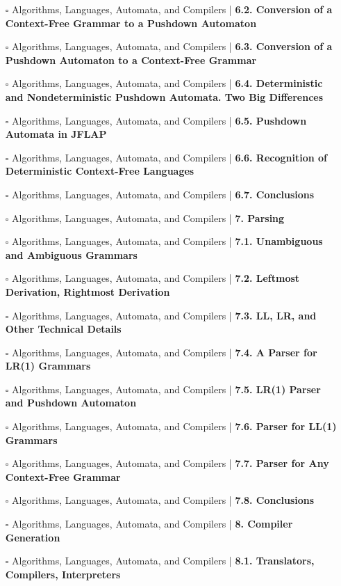 \documentclass[a4, landscape, 12pt]{article}
\newcommand{\checkbox}{$\square$}%
\begin{document}
\begin{itemize}
{}
\item [\checkbox]  Algorithms, Languages, Automata, and Compilers | \textbf{ 6.2. Conversion of a Context-Free Grammar to a Pushdown Automaton
}
\item [\checkbox]  Algorithms, Languages, Automata, and Compilers | \textbf{ 6.3. Conversion of a Pushdown Automaton to a Context-Free Grammar
}
\item [\checkbox]  Algorithms, Languages, Automata, and Compilers | \textbf{ 6.4. Deterministic and Nondeterministic Pushdown Automata. Two Big Differences
}
\item [\checkbox]  Algorithms, Languages, Automata, and Compilers | \textbf{ 6.5. Pushdown Automata in JFLAP
}
\item [\checkbox]  Algorithms, Languages, Automata, and Compilers | \textbf{ 6.6. Recognition of Deterministic Context-Free Languages
}
\item [\checkbox]  Algorithms, Languages, Automata, and Compilers | \textbf{ 6.7. Conclusions
}
\item [\checkbox]  Algorithms, Languages, Automata, and Compilers | \textbf{ 7. Parsing
}
\item [\checkbox]  Algorithms, Languages, Automata, and Compilers | \textbf{ 7.1. Unambiguous and Ambiguous Grammars
}
\item [\checkbox]  Algorithms, Languages, Automata, and Compilers | \textbf{ 7.2. Leftmost Derivation, Rightmost Derivation
}
\item [\checkbox]  Algorithms, Languages, Automata, and Compilers | \textbf{ 7.3. LL, LR, and Other Technical Details
}
\item [\checkbox]  Algorithms, Languages, Automata, and Compilers | \textbf{ 7.4. A Parser for LR(1) Grammars
}
\item [\checkbox]  Algorithms, Languages, Automata, and Compilers | \textbf{ 7.5. LR(1) Parser and Pushdown Automaton
}
\item [\checkbox]  Algorithms, Languages, Automata, and Compilers | \textbf{ 7.6. Parser for LL(1) Grammars
}
\item [\checkbox]  Algorithms, Languages, Automata, and Compilers | \textbf{ 7.7. Parser for Any Context-Free Grammar
}
\item [\checkbox]  Algorithms, Languages, Automata, and Compilers | \textbf{ 7.8. Conclusions
}
\item [\checkbox]  Algorithms, Languages, Automata, and Compilers | \textbf{ 8. Compiler Generation
}
\item [\checkbox]  Algorithms, Languages, Automata, and Compilers | \textbf{ 8.1. Translators, Compilers, Interpreters
}
\end{itemize}
\end{document}
